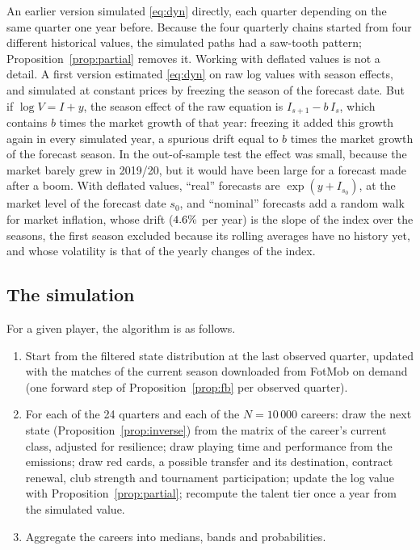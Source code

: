\documentclass[11pt]{amsart}
\theoremstyle{definition}
\theoremstyle{remark}
\begin{document}
An earlier version simulated \eqref{eq:dyn} directly, each quarter depending on the same quarter one year before. Because the four quarterly chains started from four different historical values, the simulated paths had a saw-tooth pattern; Proposition~\ref{prop:partial} removes it. Working with deflated values is not a detail. A first version estimated \eqref{eq:dyn} on raw log values with season effects, and simulated at constant prices by freezing the season of the forecast date. But if $\log V = I + y$, the season effect of the raw equation is $I_{s+1}-b\,I_s$, which contains $b$ times the market growth of that year: freezing it added this growth again in every simulated year, a spurious drift equal to $b$ times the market growth of the forecast season. In the out-of-sample test the effect was small, because the market barely grew in 2019/20, but it would have been large for a forecast made after a boom. With deflated values, ``real'' forecasts are $\exp(y+I_{s_0})$, at the market level of the forecast date $s_0$, and ``nominal'' forecasts add a random walk for market inflation, whose drift ($4.6\%$ per year) is the slope of the index over the seasons, the first season excluded because its rolling averages have no history yet, and whose volatility is that of the yearly changes of the index.

\subsection{The simulation}
For a given player, the algorithm is as follows.
\begin{enumerate}
\item Start from the filtered state distribution at the last observed quarter, updated with the matches of the current season downloaded from FotMob on demand (one forward step of Proposition~\ref{prop:fb} per observed quarter).
\item For each of the 24 quarters and each of the $N=10\,000$ careers: draw the next state (Proposition~\ref{prop:inverse}) from the matrix of the career's current class, adjusted for resilience; draw playing time and performance from the emissions; draw red cards, a possible transfer and its destination, contract renewal, club strength and tournament participation; update the log value with Proposition~\ref{prop:partial}; recompute the talent tier once a year from the simulated value.
\item Aggregate the careers into medians, bands and probabilities.
\end{enumerate}
\end{document}
